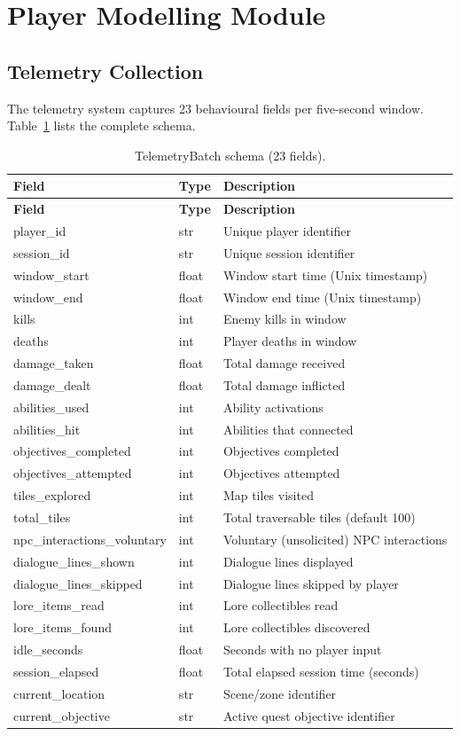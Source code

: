 \documentclass[12pt,a4paper]{report}
\begin{document}
\section{Player Modelling Module}

\subsection{Telemetry Collection}

The telemetry system captures 23 behavioural fields per five-second window. Table~\ref{tab:telemetry} lists the complete schema.

\begin{longtable}{@{}p{4cm} p{1.5cm} p{7.5cm}@{}}
\caption{TelemetryBatch schema (23 fields).} \label{tab:telemetry} \\
\toprule
\textbf{Field} & \textbf{Type} & \textbf{Description} \\
\midrule
\endfirsthead
\toprule
\textbf{Field} & \textbf{Type} & \textbf{Description} \\
\midrule
\endhead
player\_id & str & Unique player identifier \\
session\_id & str & Unique session identifier \\
window\_start & float & Window start time (Unix timestamp) \\
window\_end & float & Window end time (Unix timestamp) \\
kills & int & Enemy kills in window \\
deaths & int & Player deaths in window \\
damage\_taken & float & Total damage received \\
damage\_dealt & float & Total damage inflicted \\
abilities\_used & int & Ability activations \\
abilities\_hit & int & Abilities that connected \\
objectives\_completed & int & Objectives completed \\
objectives\_attempted & int & Objectives attempted \\
tiles\_explored & int & Map tiles visited \\
total\_tiles & int & Total traversable tiles (default 100) \\
npc\_interactions\_voluntary & int & Voluntary (unsolicited) NPC interactions \\
dialogue\_lines\_shown & int & Dialogue lines displayed \\
dialogue\_lines\_skipped & int & Dialogue lines skipped by player \\
lore\_items\_read & int & Lore collectibles read \\
lore\_items\_found & int & Lore collectibles discovered \\
idle\_seconds & float & Seconds with no player input \\
session\_elapsed & float & Total elapsed session time (seconds) \\
current\_location & str & Scene/zone identifier \\
current\_objective & str & Active quest objective identifier \\
\bottomrule
\end{longtable}
\end{document}
